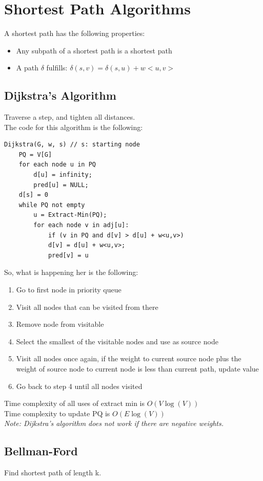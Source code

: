 \documentclass[nobib]{tufte-handout}
\begin{document}
\section{Shortest Path Algorithms}
A shortest path has the following properties:
\begin{itemize}
    \item Any subpath of a shortest path is a shortest path
    \item A path $\delta$ fulfills: $\delta(s,v) = \delta(s,u) + w<u,v>$
\end{itemize}
\subsection{Dijkstra's Algorithm}
Traverse a step, and tighten all distances.\\ The code for this algorithm is
the following:
\begin{lstlisting}
Dijkstra(G, w, s) // s: starting node
    PQ = V[G]
    for each node u in PQ
        d[u] = infinity; 
        pred[u] = NULL;
    d[s] = 0
    while PQ not empty
        u = Extract-Min(PQ);
        for each node v in adj[u]:
            if (v in PQ and d[v] > d[u] + w<u,v>)
            d[v] = d[u] + w<u,v>;
            pred[v] = u
\end{lstlisting}
So, what is happening her is the following:
\begin{enumerate}
    \item Go to first node in priority queue
    \item Visit all nodes that can be visited from there
    \item Remove node from visitable
    \item Select the smallest of the visitable nodes and use as source node
    \item Visit all nodes once again, if the weight to current source node plus the
          weight of source node to current node is less than current path, update value
    \item Go back to step 4 until all nodes visited
\end{enumerate}
Time complexity of all uses of extract min is $O(V\log(V))$\\
Time complexity to update PQ is $O(E\log(V))$\\
\textit{Note: Dijkstra's algorithm does not work if there are negative weights.}\\
\subsection{Bellman-Ford}
Find shortest path of length k.\\
\end{document}
